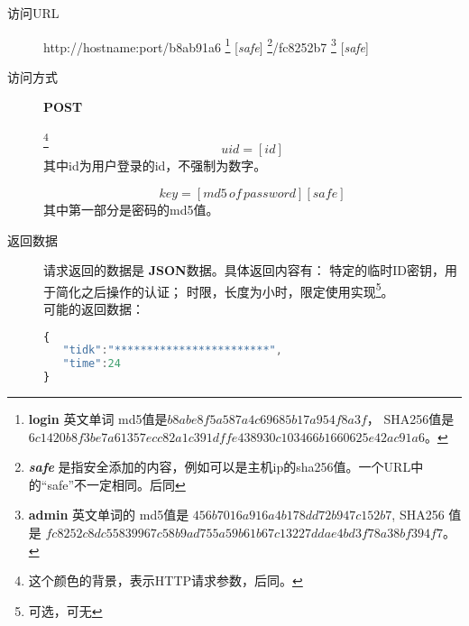 \documentclass[UTF8]{ctexart}
\def\safe{[\textit{safe}]}
\def\POST{\textbf{POST}}
\def\bfJSON{\textbf{JSON}}
\def\viaurl#1{\item[访问URL] #1}
\def\viareq#1{\item[访问方式] #1}
\def\rtdata{\item[返回数据]}
\begin{document}
    
    
    
    
    
    
    
    
    
    
    \begin{description}
   
        \viaurl http://hostname:port/b8ab91a6
        \footnote{
            \textbf{login} 英文单词 md5值是$b8abe8f5a587a4c69685b17a954f8a3f$，
            SHA256值是 
            $6c1420b8f3be7a61357ecc82a1c391dffe438930c103466b1660625e42ac91a6$。
        }
        \safe
        \footnote{\textit{\textbf{safe}} 是指安全添加的内容，例如可以是主机ip的sha256值。一个URL中的“safe”不一定相同。后同}/fc8252b7
        \footnote{
            \textbf{admin} 英文单词的
            md5值是 $456b7016a916a4b178dd72b947c152b7 $,
            SHA256 值是
            $fc8252c8dc55839967c58b9ad755a59b61b67c13227ddae4bd3f78a38bf394f7$。
        }
        \safe
        
        \viareq \POST
        
        \label{par:id}
        \footnote{这个颜色的背景，表示HTTP请求参数，后同。}
        $$uid=[id]$$
        其中id为用户登录的id，不强制为数字。
        
        \label{par:key}
         $$key=[md5\, of\, password][safe]$$
         其中第一部分是密码的md5值。
         
        \rtdata 请求返回的数据是 \bfJSON 数据。具体返回内容有：
        特定的临时ID密钥，用于简化之后操作的认证；
        时限，长度为小时，限定使用实现\footnote{可选，可无}。
         \\ 可能的返回数据：
        \begin{lstlisting}[language=JavaScript]
{
   "tidk":"************************",
   "time":24
}  
        \end{lstlisting}
        
        
    \end{description}
    
    
    
    
    
    
    
\end{document}
